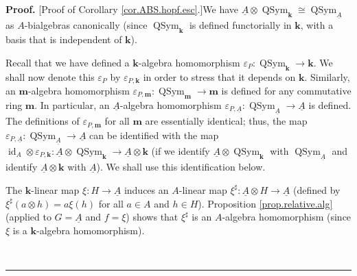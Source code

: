 \documentclass[numbers=enddot,12pt,final,onecolumn,notitlepage,abstracton]{scrartcl}%
\theoremstyle{definition}
\newenvironment{proof}[1][Proof]{\noindent\textbf{#1.} }{\ \rule{0.5em}{0.5em}}
\begin{document}
\begin{proof}
[Proof of Corollary \ref{cor.ABS.hopf.esc}.]We have $\underline{A}%
\otimes\operatorname*{QSym}\nolimits_{\mathbf{k}}\cong\operatorname*{QSym}%
\nolimits_{\underline{A}}$ as $A$-bialgebras canonically (since
$\operatorname*{QSym}\nolimits_{\mathbf{k}}$ is defined functorially in
$\mathbf{k}$, with a basis that is independent of $\mathbf{k}$).

Recall that we have defined a $\mathbf{k}$-algebra homomorphism $\varepsilon
_{P}:\operatorname*{QSym}\nolimits_{\mathbf{k}}\rightarrow\mathbf{k}$. We
shall now denote this $\varepsilon_{P}$ by $\varepsilon_{P,\mathbf{k}}$ in
order to stress that it depends on $\mathbf{k}$. Similarly, an $\mathbf{m}%
$-algebra homomorphism $\varepsilon_{P,\mathbf{m}}:\operatorname*{QSym}%
\nolimits_{\mathbf{m}}\rightarrow\mathbf{m}$ is defined for any commutative
ring $\mathbf{m}$. In particular, an $\underline{A}$-algebra homomorphism
$\varepsilon_{P,\underline{A}}:\operatorname*{QSym}\nolimits_{\underline{A}%
}\rightarrow\underline{A}$ is defined. The definitions of $\varepsilon
_{P,\mathbf{m}}$ for all $\mathbf{m}$ are essentially identical; thus, the map
$\varepsilon_{P,\underline{A}}:\operatorname*{QSym}\nolimits_{\underline{A}%
}\rightarrow\underline{A}$ can be identified with the map $\operatorname*{id}%
\nolimits_{A}\otimes\varepsilon_{P,\mathbf{k}}:\underline{A}\otimes
\operatorname*{QSym}\nolimits_{\mathbf{k}}\rightarrow\underline{A}%
\otimes\mathbf{k}$ (if we identify $\underline{A}\otimes\operatorname*{QSym}%
\nolimits_{\mathbf{k}}$ with $\operatorname*{QSym}\nolimits_{\underline{A}}$
and identify $\underline{A}\otimes\mathbf{k}$ with $\underline{A}$). We shall
use this identification below.

The $\mathbf{k}$-linear map $\xi:H\rightarrow\underline{A}$ induces an
$A$-linear map $\xi^{\sharp}:\underline{A}\otimes H\rightarrow\underline{A}$
(defined by $\xi^{\sharp}\left(  a\otimes h\right)  =a\xi\left(  h\right)  $
for all $a\in A$ and $h\in H$). Proposition \ref{prop.relative.alg} (applied
to $G=\underline{A}$ and $f=\xi$) shows that $\xi^{\sharp}$ is an $A$-algebra
homomorphism (since $\xi$ is a $\mathbf{k}$-algebra homomorphism).


\end{proof}
\end{document}

